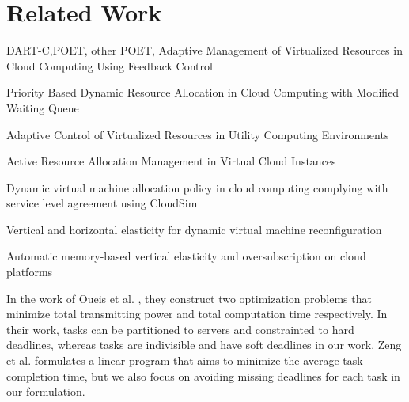 \section{Related Work}


DART-C,POET, other POET, 
Adaptive Management of Virtualized Resources in Cloud Computing Using Feedback Control

Priority Based Dynamic Resource Allocation in Cloud Computing with Modified Waiting Queue

Adaptive Control of Virtualized Resources in Utility Computing Environments 

Active Resource Allocation Management in Virtual Cloud Instances

Dynamic virtual machine allocation policy in cloud computing complying with service level agreement using CloudSim

Vertical and horizontal elasticity for dynamic virtual machine reconfiguration

Automatic memory-based vertical elasticity and oversubscription on cloud platforms







\iffalse



\label{s1}







In the work of Oueis et al. \cite{fogba}, they construct two optimization problems that minimize total transmitting power and total computation time respectively. In their work, tasks can be partitioned to servers and constrainted to hard deadlines, whereas tasks are indivisible and have soft deadlines in our work. Zeng et al. \cite{jopt} formulates a linear program that aims to minimize the average task completion time, but we also focus on avoiding missing deadlines for each task in our formulation.


